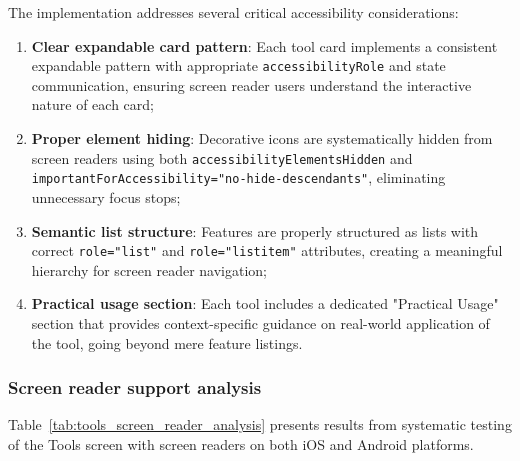 The implementation addresses several critical accessibility considerations:

\begin{enumerate}
    \item \textbf{Clear expandable card pattern}: Each tool card implements a consistent expandable pattern with appropriate \texttt{accessibilityRole} and state communication, ensuring screen reader users understand the interactive nature of each card;
    
    \item \textbf{Proper element hiding}: Decorative icons are systematically hidden from screen readers using both \texttt{accessibilityElementsHidden} and \\\texttt{importantForAccessibility="no-hide-descendants"}, eliminating unnecessary focus stops;
    
    \item \textbf{Semantic list structure}: Features are properly structured as lists with correct \texttt{role="list"} and \texttt{role="listitem"} attributes, creating a meaningful hierarchy for screen reader navigation;
    
    \item \textbf{Practical usage section}: Each tool includes a dedicated "Practical Usage" section that provides context-specific guidance on real-world application of the tool, going beyond mere feature listings.
\end{enumerate}

\subsubsection{Screen reader support analysis}

Table~\ref{tab:tools_screen_reader_analysis} presents results from systematic testing of the Tools screen with screen readers on both iOS and Android platforms.

